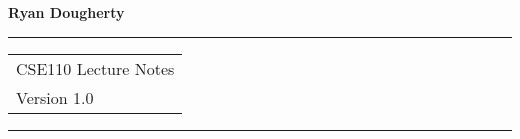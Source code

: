 \documentclass{llncs}
\begin{document}
\thispagestyle{empty}
\begin{flushleft}
\LARGE\bfseries Ryan Dougherty\\[2cm]
\end{flushleft}
\rule{\textwidth}{1pt}
\vspace{2pt}
\begin{flushright}
\Huge
\begin{tabular}{@{}l}
CSE110 Lecture Notes\\[6pt]
{\Large Version 1.0}
\end{tabular}
\end{flushright}
\rule{\textwidth}{1pt}
\vfill
\newpage


%
\newpage
\tableofcontents
\newpage
%

%
\end{document}
